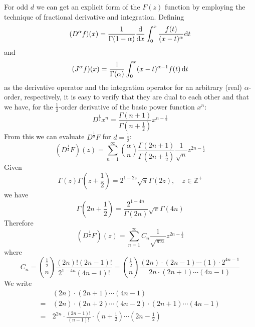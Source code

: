 \documentclass{report}
\begin{document}
For odd $d$ we can get an explicit form of the $F(z)$ function by employing the technique of fractional derivative and integration. Defining
\begin{equation}
  (D^\alpha f)(x)= \frac{1}{\Gamma(1-\alpha)}\frac{\rm d}{{\rm d}x}\int^x_0
  \frac{f(t)}{(x-t)^\alpha}{\rm d}t
\end{equation}
and
\begin{equation}
  (J^\alpha f)(x) = \frac{1}{\Gamma(\alpha)}\int^x_0(x-t)^{\alpha-1}f(t)\,{\rm d}t
\end{equation}
as the derivative operator and the integration operator for an arbitrary (real) $\alpha$-order, respectively, it is easy to verify that they are dual to each other and that we have, for the $\frac{1}{2}$-order derivative of the basic power function $x^n$:
\begin{equation}
  D^\frac{1}{2} x^n = \frac{\Gamma(n+1)}{\Gamma(n+\frac{1}{2})} x^{n-\frac{1}{2}}
\end{equation}
From this we can evaluate $D^\frac{1}{2} F$ for $d=\frac{1}{2}$:
\begin{equation}
  (D^\frac{1}{2} F)(z) = \sum^\infty_{n=1} \binom{\alpha}{n} \frac{\Gamma(2n+1)}{\Gamma(2n+\frac{1}{2})}\frac{1}{\sqrt{n}}z^{2n-\frac{1}{2}}
\end{equation}
Given
\begin{equation}
  \Gamma(z)\Gamma(z+\frac{1}{2})=2^{1-2z}\sqrt{\pi}\Gamma(2z),\quad z\in\mathbb{Z}^+
\end{equation}
we have
\begin{equation}
  \Gamma(2n+\frac{1}{2}) = \frac{2^{1-4n}}{\Gamma(2n)}\sqrt{\pi}\Gamma(4n)
\end{equation}
Therefore
\begin{equation}
  (D^\frac{1}{2}F)(z) = \sum^\infty_{n=1} C_n \frac{1}{\sqrt{\pi n}} z^{2n-\frac{1}{2}}
\end{equation}
where
\begin{equation}
  C_n = \binom{\frac{1}{2}}{n} \frac{(2n)!(2n-1)!}{2^{1-4n} (4n-1)!} =\binom{\frac{1}{2}}{n} \frac{(2n)\cdot(2n-1)\cdots(1)\cdot2^{4n-1}}{2n\cdot(2n+1)\cdots(4n-1)}
\end{equation}
We write
\begin{equation}
  \begin{split}
    &(2n)\cdot(2n+1)\cdots(4n-1)\\
    =\,&(2n)\cdot(2n+2)\cdots(4n-2) \cdot (2n+1)\cdots(4n-1) \\
    =\,& 2^{2n}\cdot \frac{(2n-1)!}{(n-1)!}\cdot\left(n+\frac{1}{2}\right)\cdots\left(2n-\frac{1}{2}\right)
  \end{split}
\end{equation}
\end{document}

